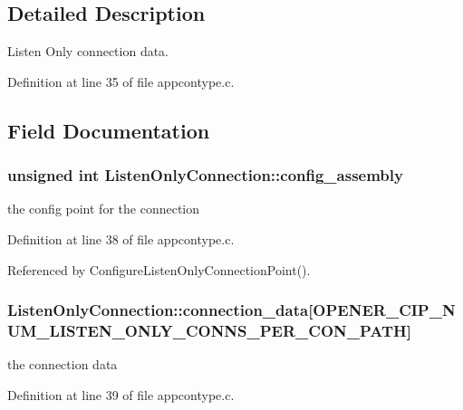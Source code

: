 \subsection{\-Detailed \-Description}
\-Listen \-Only connection data. 

\-Definition at line 35 of file appcontype.\-c.



\subsection{\-Field \-Documentation}
\hypertarget{structListenOnlyConnection_a24a9027536ff98fdd4b6988e51ba1dc5}{
\subsubsection[{config\-\_\-assembly}]{\setlength{\rightskip}{0pt plus 5cm}unsigned int {\bf \-Listen\-Only\-Connection\-::config\-\_\-assembly}}}\label{d3/d01/structListenOnlyConnection_a24a9027536ff98fdd4b6988e51ba1dc5}
the config point for the connection 

\-Definition at line 38 of file appcontype.\-c.



\-Referenced by \-Configure\-Listen\-Only\-Connection\-Point().

\hypertarget{structListenOnlyConnection_ad104ff3792984bca1ae96d08c5c4cb43}{
\subsubsection[{connection\-\_\-data}]{ {\bf \-Listen\-Only\-Connection\-::connection\-\_\-data}\mbox{[}{\bf \-O\-P\-E\-N\-E\-R\-\_\-\-C\-I\-P\-\_\-\-N\-U\-M\-\_\-\-L\-I\-S\-T\-E\-N\-\_\-\-O\-N\-L\-Y\-\_\-\-C\-O\-N\-N\-S\-\_\-\-P\-E\-R\-\_\-\-C\-O\-N\-\_\-\-P\-A\-T\-H}\mbox{]}}}\label{d3/d01/structListenOnlyConnection_ad104ff3792984bca1ae96d08c5c4cb43}
the connection data 

\-Definition at line 39 of file appcontype.\-c.



